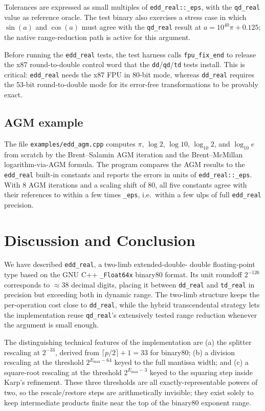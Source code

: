 \documentclass[11pt,a4paper]{article}
\begin{document}
Tolerances are expressed as small multiples of
\texttt{edd\_real::\_eps}, with the \texttt{qd\_real} value as
reference oracle.  The test binary also exercises a stress case
in which $\sin(a)$ and $\cos(a)$ must agree with the
\texttt{qd\_real} result at $a = 10^{40}\pi + 0.125$; the native
range-reduction path is active for this argument.

Before running the \texttt{edd\_real} tests, the test harness
calls \texttt{fpu\_fix\_end} to release the x87 round-to-double
control word that the \texttt{dd}/\texttt{qd}/\texttt{td} tests
install.  This is critical: \texttt{edd\_real} needs the x87 FPU
in 80-bit mode, whereas \texttt{dd\_real} requires the 53-bit
round-to-double mode for its error-free transformations to be
provably exact.

\subsection{AGM example}

The file \texttt{examples/edd\_agm.cpp} computes $\pi$, $\log 2$,
$\log 10$, $\log_{10} 2$, and $\log_{10} e$ from scratch by the
Brent--Salamin AGM iteration and the Brent--McMillan
logarithm-via-AGM formula.  The program compares the AGM results
to the \texttt{edd\_real} built-in constants and reports the
errors in units of \texttt{edd\_real::\_eps}.  With $8$ AGM
iterations and a scaling shift of $80$, all five constants agree
with their references to within a few times \texttt{\_eps}, i.e.\
within a few ulps of full \texttt{edd\_real} precision.

\section{Discussion and Conclusion}
\label{sec:conclusion}

We have described \texttt{edd\_real}, a two-limb extended-double-%
double floating-point type based on the GNU C++ \texttt{\_Float64x}
binary80 format.  Its unit roundoff $2^{-126}$ corresponds to
$\approx 38$ decimal digits, placing it between \texttt{dd\_real}
and \texttt{td\_real} in precision but exceeding both in dynamic
range.  The two-limb structure keeps the per-operation cost close
to \texttt{dd\_real}, while the hybrid transcendental strategy
lets the implementation reuse \texttt{qd\_real}'s extensively
tested range reduction whenever the argument is small enough.

The distinguishing technical features of the implementation are
(a) the splitter rescaling at $2^{-33}$, derived from
$\lceil p/2 \rceil + 1 = 33$ for binary80; (b) a division
rescaling at the threshold $2^{E_{\max}-64}$ keyed to the full
mantissa width; and (c) a square-root rescaling at the threshold
$2^{E_{\max}-3}$ keyed to the squaring step inside Karp's
refinement.  These three thresholds are all exactly-representable
powers of two, so the rescale/restore steps are arithmetically
invisible; they exist solely to keep intermediate products finite
near the top of the binary80 exponent range.
\end{document}
